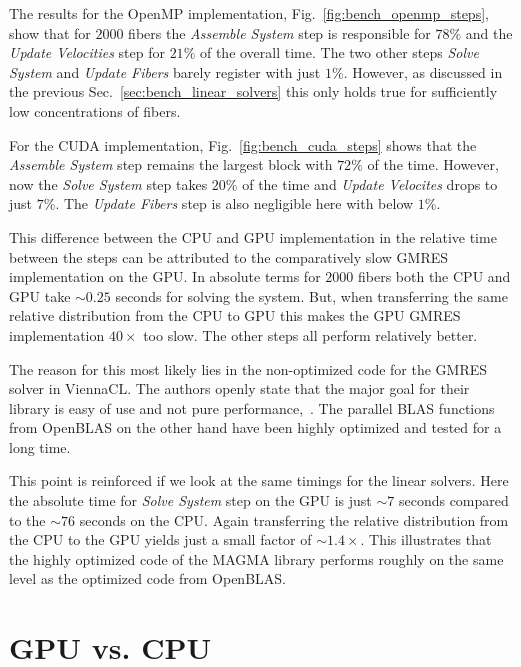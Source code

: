 The results for the OpenMP implementation, Fig.~\ref{fig:bench_openmp_steps}, show that for $2000$ fibers the \emph{Assemble System} step is responsible for $78\%$ and the \emph{Update Velocities} step for $21\%$ of the overall time. The two other steps \emph{Solve System} and \emph{Update Fibers} barely register with just $1\%$. However, as discussed in the previous Sec.~\ref{sec:bench_linear_solvers} this only holds true for sufficiently low concentrations of fibers.

\begin{figure}[htbp]
  \centering

\end{figure}

For the CUDA implementation, Fig.~\ref{fig:bench_cuda_steps} shows that the \emph{Assemble System} step remains the largest block with $72\%$ of the time. However, now the \emph{Solve System} step takes $20\%$ of the time and \emph{Update Velocites} drops to just $7\%$. The \emph{Update Fibers} step is also negligible here with below $1\%$.

This difference between the CPU and GPU implementation in the relative time between the steps can be attributed to the comparatively slow GMRES implementation on the GPU. In absolute terms for $2000$ fibers both the CPU and GPU take ${\sim}0.25$ seconds for solving the system. But, when transferring the same relative distribution from the CPU to GPU this makes the GPU GMRES implementation $40×$ too slow. The other steps all perform relatively better.

The reason for this most likely lies in the non-optimized code for the GMRES solver in ViennaCL. The authors openly state that the major goal for their library is easy of use and not pure performance,~\cite{ViennaCLRupp2010}. The parallel BLAS functions from OpenBLAS on the other hand have been highly optimized and tested for a long time.

This point is reinforced if we look at the same timings for the linear solvers. Here the absolute time for \emph{Solve System} step on the GPU is just ${\sim}7$ seconds compared to the ${\sim}76$ seconds on the CPU. Again transferring the relative distribution from the CPU to the GPU yields just a small factor of ${\sim}1.4×$. This illustrates that the highly optimized code of the MAGMA library performs roughly on the same level as the optimized code from OpenBLAS.

\section{GPU vs. CPU}


